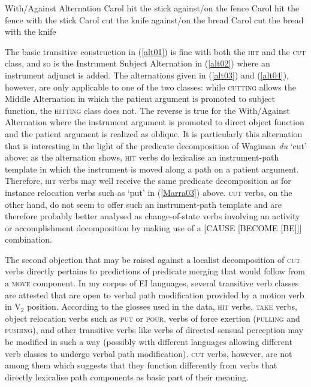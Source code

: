 \ea With/Against Alternation \label{alt04}
\ea Carol hit the stick against/on the fence
\ex Carol hit the fence with the stick
\ex \judge*Carol cut the knife against/on the bread
\ex Carol cut the bread with the knife
\z
\z

The basic transitive construction in (\ref{alt01}) is fine with both the \textsc{hit} and the \textsc{cut} class, and so is the Instrument Subject Alternation in (\ref{alt02}) where an instrument adjunct is added. The alternations given in (\ref{alt03}) and (\ref{alt04}), however, are only applicable to one of the two classes: while \textsc{cutting} allows the Middle Alternation in which the patient argument is promoted to subject function, the \textsc{hitting} class does not. The reverse is true for the With/Against Alternation where the instrument argument is promoted to direct object function and the patient argument is realized as oblique. It is particularly this alternation that is interesting in the light of the predicate decomposition of Wagiman \textit{du} `cut' above: as the alternation shows, \textsc{hit} verbs do lexicalise an instrument-path template in which the instrument is moved along a path on a patient argument. Therefore, \textsc{hit} verbs may well receive the same predicate decomposition as for instance relocation verbs such as `put' in (\ref{Marra03}) above. \textsc{cut} verbs, on the other hand, do not seem to offer such an instrument-path template and are therefore probably better analysed as change-of-state verbs involving an activity or accomplishment decomposition by making use of a [CAUSE [BECOME [BE]]] combination.

The second objection that may be raised against a localist decomposition of \textsc{cut} verbs directly pertains to  predictions of predicate merging that would follow from a \textsc{move} component. In my corpus of EI languages, several transitive verb classes are attested that are open to verbal path modification provided by a motion verb in V$_2$ position. According to the glosses used in the data, \textsc{hit} verbs, \textsc{take} verbs, object relocation verbs such as \textsc{put} or \textsc{pour}, verbs of force exertion (\textsc{pulling} and \textsc{pushing}), and other transitive verbs like verbs of directed sensual perception may be modified in such a way (possibly with different languages allowing different verb classes to undergo verbal path modification). \textsc{cut} verbs, however, are not among them which suggests that they function differently from verbs that directly lexicalise path components as basic part of their meaning.

